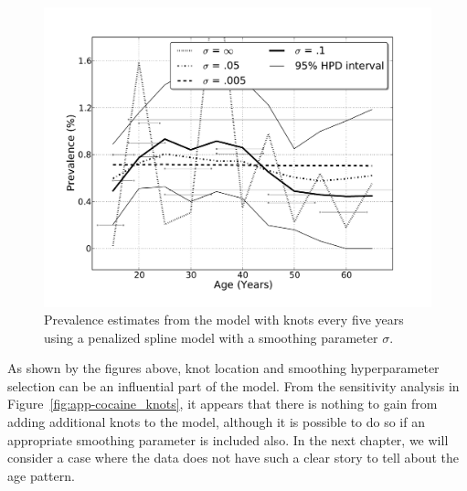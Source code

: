     \begin{figure}[h]
        \begin{center}
            \includegraphics[width=\textwidth]{applications/cocaine_dependence-smoothing.pdf}
            \caption{Prevalence estimates from the model with knots every five years
              using a penalized spline model with a smoothing
              parameter $\sigma$. }
        \label{fig:app-cocaine_smoothing}
        \end{center}
    \end{figure}

As shown by the figures above, knot location and smoothing
hyperparameter selection can be an influential part of the model.
From the sensitivity analysis in Figure~\ref{fig:app-cocaine_knots},
it appears that there is nothing to gain from adding additional
knots to the model, although it is possible to do so if an appropriate
smoothing parameter is included also.  In the next chapter, we will
consider a case where the data does not have such a clear story to
tell about the age pattern.
